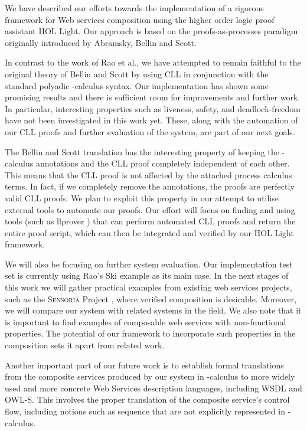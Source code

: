 \documentclass[copyright,creativecommons]{eptcs}
\begin{document}
We have described our efforts towards the implementation of a rigorous framework for Web services composition using the higher order logic proof assistant HOL Light. Our approach is based on the proofs-as-processes paradigm originally introduced by Abramsky, Bellin and Scott.

In contrast to the work of Rao et al., we have attempted to remain faithful to the original theory of Bellin and Scott by using CLL in conjunction with the standard polyadic -calculus syntax. Our implementation has shown some promising results and there is sufficient room for improvements and further work. In particular, interesting properties such as liveness, safety, and deadlock-freedom have not been investigated in this work yet. These, along with the automation of our CLL proofs and further evaluation of the system, are part of our next goals.

The Bellin and Scott translation has the interesting property of keeping the -calculus annotations and the CLL proof completely independent of each other. This means that the CLL proof is not affected by the attached process calculus terms. In fact, if we completely remove the annotations, the proofs are perfectly valid CLL proofs. We plan to exploit this property in our attempt to utilise external tools to automate our proofs. Our effort will focus on finding and using tools (such as llprover \cite{tamura1998user}) that can perform automated CLL proofs and return the entire proof script, which can then be integrated and verified by our HOL Light framework.

We will also be focusing on further system evaluation. Our implementation test set is currently using Rao's Ski example as its main case. In the next stages of this work we will gather practical examples from existing web services projects, such as the \textsc{Sensoria} Project \cite{sensoria2006}, where verified composition is desirable. Moreover, we will compare our system with related systems in the field. We also note that it is important to find examples of composable web services with non-functional properties. The potential of our framework to incorporate such properties in the composition sets it apart from related work. 

Another important part of our future work is to establish formal translations from the composite services produced by our system in -calculus to more widely used and more concrete Web Services description languages, including WSDL and OWL-S. This involves the proper translation of the composite service's control flow, including notions such as sequence that are not explicitly represented in -calculus.
\end{document}

